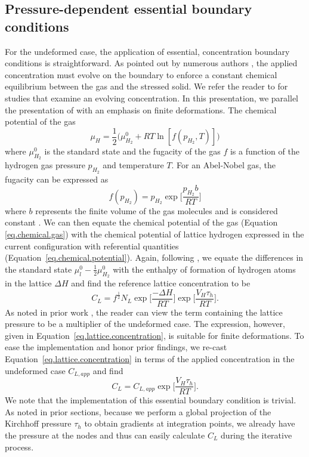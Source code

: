 \documentclass[10pt]{elsarticle}
\begin{document}
\subsection{Pressure-dependent essential boundary conditions}
For the undeformed case, the application of essential, concentration boundary conditions is straightforward. As pointed out by numerous authors \cite{Wriedt1970,SanMarchi2007,Anand2013}, the applied concentration must evolve on the boundary to enforce a constant chemical equilibrium between the gas and the stressed solid. We refer the reader to \citet{Anand2013} for studies that examine an evolving concentration. In this presentation, we parallel the presentation of \citet{SanMarchi2007} with an emphasis on finite deformations. The chemical potential of the gas 
\begin{equation}
\label{eq.chemical.gas} \mu_{H} = \frac{1}{2} \big( \mu^{0}_{H_{2}} + RT\ln[f(p_{H_{2}},T)] \big)	
\end{equation}
where $\mu^{0}_{H_{2}}$ is the standard state and the fugacity of the gas $f$ is a function of the hydrogen gas pressure $p_{H_{2}}$ and temperature $T$. For an Abel-Nobel gas, the fugacity can be expressed as
\begin{equation}
\label{eq.chemical.gas} f(p_{H_{2}}) = p_{H_{2}} \exp \bigg[ \frac{p_{H_{2}}b}{RT} \bigg]
\end{equation}
where $b$ represents the finite volume of the gas molecules and is considered constant \cite{SanMarchi2007}. We can then equate the chemical potential of the gas (Equation \ref{eq.chemical.gas}) with the chemical potential of lattice hydrogen expressed in the current configuration with referential quantities (Equation~\ref{eq.chemical.potential}). Again, following \citet{SanMarchi2007}, we equate the differences in the standard state $\mu_{l}^{0} - \frac{1}{2}\mu^{0}_{H_{2}}$ with the enthalpy of formation of hydrogen atoms in the lattice $\Delta H$ and find the reference lattice concentration to be
\begin{equation}
\label{eq.lattice.concentration} C_{L} = f^{\frac{1}{2}}N_{L} \exp \bigg[ \frac{-\Delta H}{RT} \bigg] \exp \bigg[ \frac{V_{H} \tau_{h}}{RT} \bigg].
\end{equation}
As noted in prior work \cite{SanMarchi2007}, the reader can view the term containing the lattice pressure to be a multiplier of the undeformed case. The expression, however, given in Equation~\ref{eq.lattice.concentration}, is suitable for finite deformations. To ease the implementation and honor prior findings, we re-cast Equation~\ref{eq.lattice.concentration} in terms of the applied concentration in the undeformed case $C_{L,app}$ and find
\begin{equation}
\label{eq.lattice.concentration.simplified} C_{L} = C_{L,app} \exp \bigg[ \frac{V_{H} \tau_{h}}{RT} \bigg].
\end{equation}
We note that the implementation of this essential boundary condition is trivial. As noted in prior sections, because we perform a global projection of the Kirchhoff pressure $\tau_{h}$ to obtain gradients at integration points, we already have the pressure at the nodes and thus can easily calculate $C_{L}$ during the iterative process.  
\end{document}
